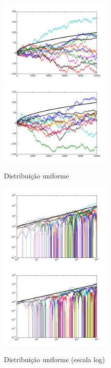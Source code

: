 \documentclass[12pt,a4paper,hidelinks]{article}
\begin{document}
  

  
  
  
  
  

  \begin{figure}[htb]
    \caption{Distribuição uniforme}
    \includegraphics[width=0.5\textwidth]{figures/uni__0.pdf}
    \includegraphics[width=0.5\textwidth]{figures/uni__1.pdf}
    \label{fig:randomwalk_uniform}
  \end{figure}

  \begin{figure}[htb]
    \caption{Distribuição uniforme (escala log)}
    \includegraphics[width=0.5\textwidth]{figures/uni__0__log.pdf}
    \includegraphics[width=0.5\textwidth]{figures/uni__1__log.pdf}
    \label{fig:randomwalk_uniform_log}
  \end{figure}
\end{document}
